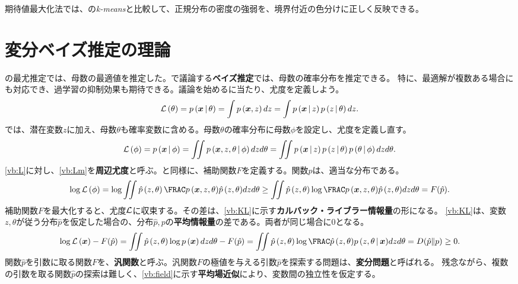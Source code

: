 \documentclass[10pt,a4paper]{book}
\begin{document}
期待値最大化法では、の\textit{k-means}と比較して、正規分布の密度の強弱を、境界付近の色分けに正しく反映できる。

\section{変分ベイズ推定の理論\label{sect:vb}}

の最尤推定では、母数の最適値を推定した。で議論する\textbf{ベイズ推定}では、母数の確率分布を推定できる。
特に、最適解が複数ある場合にも対応でき、過学習の抑制効果も期待できる。議論を始めるに当たり、尤度を定義しよう。
%
\begin{equation}
\label{eq:vb:L}
\Lk{\theta} =
\prob{\bm{x}}[\theta] =
\int \prob{\bm{x},z} dz =
\int \prob{\bm{x}}[z] \prob{z}[\theta] dz.
\end{equation}
%
では、潜在変数$z$に加え、母数$\theta$も確率変数に含める。母数$\theta$の確率分布に母数$\phi$を設定し、尤度を定義し直す。
%
\begin{equation}
\label{eq:vb:Lm}
\Lk{\phi} =
\prob{\bm{x}}[\phi] =
\iint \prob{\bm{x},z,\theta}[\phi] dz d\theta =
\iint \prob{\bm{x}}[z] \prob{z}[\theta] \prob{\theta}[\phi] dz d\theta.
\end{equation}
%
\eqref{vb:L}に対し、\eqref{vb:Lm}を\textbf{周辺尤度}と呼ぶ。と同様に、補助関数$F$を定義する。関数$\hat{p}$は、適当な分布である。
%
\begin{equation}
\log \Lk{\phi} =
\log \iint \hatprob{z,\theta} \frac{\prob{\bm{x},z,\theta}}{\hatprob{z,\theta}} dz d\theta \geq
\iint \hatprob{z,\theta} \log \frac{\prob{\bm{x},z,\theta}}{\hatprob{z,\theta}} dz d\theta = F(\hat{p}).
\end{equation}
%
補助関数$F$を最大化すると、尤度$\mathcal{L}$に収束する。その差は、\eqref{vb:KL}に示す\textbf{カルバック・ライブラー情報量}の形になる。
\eqref{vb:KL}は、変数$z,\theta$が従う分布$\hat{p}$を仮定した場合の、分布$\hat{p},p$の\textbf{平均情報量}の差である。両者が同じ場合に$0$となる。
%
\begin{equation}
\label{eq:vb:KL}
\log \Lk{\bm{x}} - F(\hat{p}) =
\iint \hatprob{z,\theta} \log \prob{\bm{x}} dz d\theta - F(\hat{p}) =
\iint \hatprob{z,\theta} \log \frac{\hatprob{z,\theta}}{\prob{z,\theta}[\bm{x}]} dz d\theta =
\KL{\hat{p}}{p} \geq 0.
\end{equation}
%
関数$\hat{p}$を引数に取る関数$F$を、\textbf{汎関数}と呼ぶ。汎関数$F$の極値を与える引数$\hat{p}$を探索する問題は、\textbf{変分問題}と呼ばれる。
残念ながら、複数の引数を取る関数$\hat{p}$の探索は難しく、\eqref{vb:field}に示す\textbf{平均場近似}により、変数間の独立性を仮定する。
\end{document}
